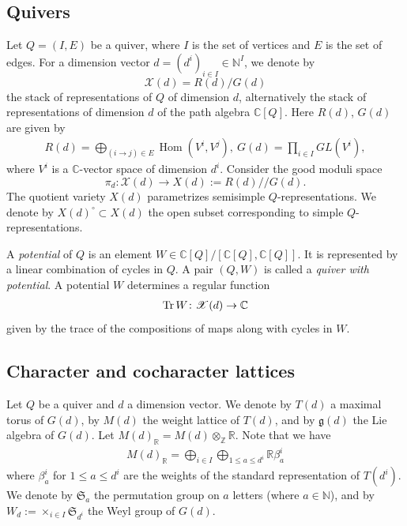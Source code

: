 \documentclass [11pt,oneside,a4paper,mathscr]{amsart}
\theoremstyle{definition}
\renewcommand{\leq}{\leqslant}
\newcommand{\X}{\mathscr{X}}
\newcommand{\Hom}{\operatorname{Hom}}
\newcommand{\Tr}{\mathop{\rm Tr}}
\newcommand{\ssslash}{/\!\!/}
\begin{document}
\subsection{Quivers}\label{section:prelim}
Let $Q=(I,E)$ be a quiver, where $I$ is the set of 
vertices and $E$ is the set of edges. 
For a dimension vector $d=(d^i)_{i\in I}\in\mathbb{N}^I$, 
we denote by  
\[\X(d)=R(d)/G(d)\]
the stack of representations of $Q$ of dimension $d$, alternatively the stack of representations of dimension $d$ of the path algebra $\mathbb{C}[Q]$.
Here $R(d)$, $G(d)$ are given by 
\begin{align*}
    R(d)=\bigoplus_{(i\to j) \in E}\Hom(V^i, V^j), \ 
    G(d)=\prod_{i\in I}GL(V^i), 
\end{align*}
where $V^i$ is a $\mathbb{C}$-vector space of dimension $d^i$. 
Consider the good moduli space
\[\pi_d \colon \X(d)\to X(d):=R(d)\ssslash G(d).\]
The quotient variety $X(d)$ parametrizes semisimple 
$Q$-representations. We denote by $X(d)^{\circ} \subset X(d)$
the open subset corresponding to simple $Q$-representations. 

A \textit{potential} of $Q$ is an element 
$W \in \mathbb{C}[Q]/[\mathbb{C}[Q], \mathbb{C}[Q]]$. 
It is represented by a linear combination of 
cycles in $Q$. 
A pair $(Q, W)$ is called a \textit{quiver with potential}. 
A potential $W$ determines a regular function 
\begin{align}\label{map:trW}
    \Tr W \colon \X(d) \to \mathbb{C}
\end{align}
given by the trace of the compositions 
of maps along with cycles in $W$. 


\subsection{Character and cocharacter lattices}\label{subsec:character}
Let $Q$ be a quiver and $d$ a dimension vector. 
We denote by $T(d)$ a maximal torus of $G(d)$, by $M(d)$ the weight lattice of $T(d)$, 
and by $\mathfrak{g}(d)$ the Lie algebra of $G(d)$. 
Let $M(d)_{\mathbb{R}}=M(d)\otimes_{\mathbb{Z}}\mathbb{R}$. Note that we have 
\begin{align*}
M(d)_{\mathbb{R}}=\bigoplus_{i\in I} \bigoplus_{1\leq a\leq d^i}
\mathbb{R} \beta_a^i
\end{align*}
where $\beta_a^i$ for $1\leq a \leq d^i$ 
are the weights of the standard representation of 
$T(d^i)$.
We denote by $\mathfrak{S}_a$ the permutation group on $a$ letters (where $a\in \mathbb{N}$), 
and by $W_d:=\times_{i\in I}\mathfrak{S}_{d^i}$ the Weyl 
group of $G(d)$.
\end{document}
